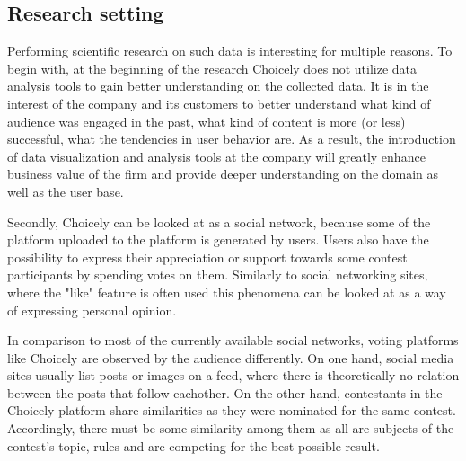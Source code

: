 \subsection{Research setting}
    Performing scientific research on such data is interesting for multiple reasons. To begin with, at the beginning of the research Choicely does not utilize data analysis tools to gain better understanding on the collected data. It is in the interest of the company and its customers to better understand what kind of audience was engaged in the past, what kind of content is more (or less) successful, what the tendencies in user behavior are. As a result, the introduction of data visualization and analysis tools at the company will greatly enhance business value of the firm and provide deeper understanding on the domain as well as the user base.   
    
    Secondly, Choicely can be looked at as a social network, because some of the platform uploaded to the platform is generated by users. Users also have the possibility to express their appreciation or support towards some contest participants by spending votes on them. Similarly to social networking sites, where the "like" feature is often used \cite{jang2015noreciprocity, bakhshi2014faces} this phenomena can be looked at as a way of expressing personal opinion. 
    
    In comparison to most of the currently available social networks, voting platforms like Choicely are observed by the audience differently. On one hand, social media sites usually list posts or images on a feed, where there is theoretically no relation between the posts that follow eachother. On the other hand, contestants in the Choicely platform share similarities as they were nominated for the same contest. Accordingly, there must be some similarity among them as all are subjects of the contest's topic, rules and are competing for the best possible result. 
    
